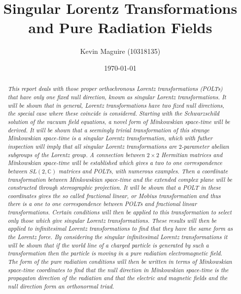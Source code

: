 \documentclass[floatfix,aps,prd,amsmath,amssymb]{revtex4}
\begin{document}
\title{Singular Lorentz Transformations and Pure Radiation Fields}
\author{Kevin Maguire (10318135)}
\date{\today}

\begin{abstract}
  \textit{This report deals with those proper orthochronous Lorentz transformations (POLTs) that have only one fixed null direction, known as singular Lorentz transformations. It will be shown that in general, Lorentz transformations have two fized null directions, the special case where these coincide is considered. Starting with the Schwarzschild solution of the vacuum field equations, a novel form of Minkowskian space-time will be derived. It will be shown that a seemingly trivial transformation of this strange Minkowskian space-time is a singular Lorentz transformation, which with futher inspection will imply that all singular Lorentz transformations are $2$-parameter abelian subgroups of the Lorentz group. A connection between $2 \times 2$ Hermitian matrices and Minkowskian space-time will be established which gives a two to one correspondence between $SL(2,\mathbb{C})$ matrices and POLTs, with numerous examples. Then a coordinate transformation between Minkowskian space-time and the extended complex plane will be constructed through stereographic projection. It will be shown that a POLT in these coordinates gives the so called fractional linear, or Mobius transformation and thus there is a one to one correspondence between POLTs and fractional linear transformations. Certain conditions will then be applied to this transformation to select only those which give singular Lorentz transformations. These results will then be applied to infinitesimal Lorentz transformations to find that they have the same form as the Lorentz force. By considering the singular infinitesimal Lorentz transformations it will be shown that if the world line of a charged particle is generated by such a transformation then the particle is moving in a pure radiation electromagnetic field. The form of the pure radiation conditions will then be written in terms of Minkowskian space-time coordinates to find that the null direction in Minkowskian space-time is the propagaton direction of the radiation and that the electric and magnetic fields and the null direction form an orthonormal triad.}
\end{abstract}

\maketitle 
{}
\end{document}
